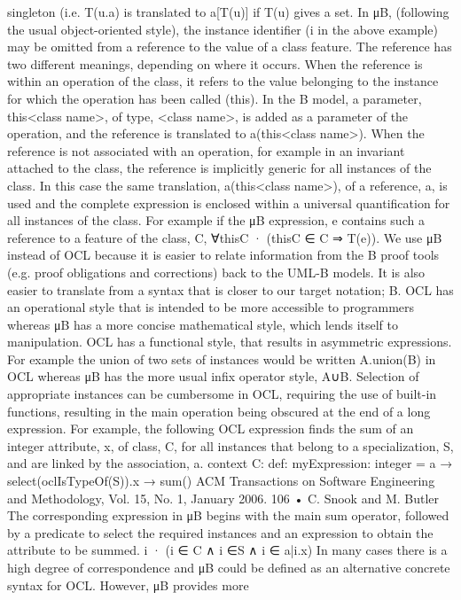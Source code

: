 singleton (i.e. T(u.a) is translated to a[T(u)] if T(u) gives a set.
In μB, (following the usual object-oriented style), the instance identifier
(i in the above example) may be omitted from a reference to the value of a
class feature. The reference has two different meanings, depending on where
it occurs. When the reference is within an operation of the class, it refers to
the value belonging to the instance for which the operation has been called
(this). In the B model, a parameter, this<class name>, of type, <class name>,
is added as a parameter of the operation, and the reference is translated to
a(this<class name>). When the reference is not associated with an operation,
for example in an invariant attached to the class, the reference is implicitly generic for all instances of the class. In this case the same translation,
a(this<class name>), of a reference, a, is used and the complete expression is
enclosed within a universal quantification for all instances of the class. For example if the μB expression, e contains such a reference to a feature of the class,
C, ∀thisC · (thisC ∈ C ⇒ T(e)).
We use μB instead of OCL because it is easier to relate information from the
B proof tools (e.g. proof obligations and corrections) back to the UML-B models.
It is also easier to translate from a syntax that is closer to our target notation; B. OCL has an operational style that is intended to be more accessible to
programmers whereas μB has a more concise mathematical style, which lends
itself to manipulation. OCL has a functional style, that results in asymmetric
expressions. For example the union of two sets of instances would be written
A.union(B) in OCL whereas μB has the more usual infix operator style, A∪B.
Selection of appropriate instances can be cumbersome in OCL, requiring the
use of built-in functions, resulting in the main operation being obscured at the
end of a long expression. For example, the following OCL expression finds the
sum of an integer attribute, x, of class, C, for all instances that belong to a
specialization, S, and are linked by the association, a.
context C:
def: myExpression: integer = a → select(oclIsTypeOf(S)).x → sum()
ACM Transactions on Software Engineering and Methodology, Vol. 15, No. 1, January 2006.
106 • C. Snook and M. Butler
The corresponding expression in μB begins with the main sum operator,
followed by a predicate to select the required instances and an expression to
obtain the attribute to be summed.
i · (i ∈ C ∧ i ∈S ∧ i ∈ a|i.x)
In many cases there is a high degree of correspondence and μB could be
defined as an alternative concrete syntax for OCL. However, μB provides more
